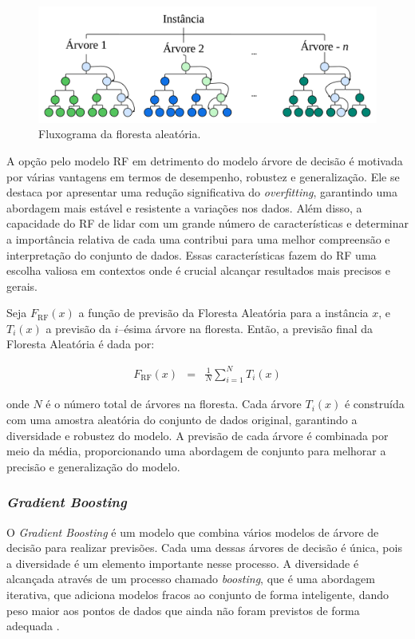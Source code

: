  \begin{figure}[!htb]
 	\centering
 	\caption{Fluxograma da floresta aleatória.}
 	\label{fig:rf}
 	\includegraphics[width=\linewidth]{Modelos/Figuras/RF.pdf}
 \end{figure}
 
A opção pelo modelo RF em detrimento do modelo árvore de decisão é motivada por várias vantagens em termos de desempenho, robustez e generalização. Ele se destaca por apresentar uma redução significativa do \textit{overfitting}, garantindo uma abordagem mais estável e resistente a variações nos dados. Além disso, a capacidade do RF de lidar com um grande número de características e determinar a importância relativa de cada uma contribui para uma melhor compreensão e interpretação do conjunto de dados. Essas características fazem do RF uma escolha valiosa em contextos onde é crucial alcançar resultados mais precisos e gerais.

Seja $ F_{\text{RF}}(x) $ a função de previsão da Floresta Aleatória para a instância $ x $, e $ T_i(x) $ a previsão da $ i $--ésima árvore na floresta. Então, a previsão final da Floresta Aleatória é dada por:

\begin{eqnarray}
	F_{\text{RF}}(x) &=& \frac{1}{N} \sum_{i=1}^{N} T_i(x) 
\end{eqnarray}

\noindent onde $ N $ é o número total de árvores na floresta. Cada árvore $ T_i(x) $ é construída com uma amostra aleatória do conjunto de dados original, garantindo a diversidade e robustez do modelo. A previsão de cada árvore é combinada por meio da média, proporcionando uma abordagem de conjunto para melhorar a precisão e generalização do modelo.
 
 \subsubsection{\textit{Gradient Boosting}}\label{subsubsec:lgbxgb}
 
 O \textit{Gradient Boosting} é um modelo que combina vários modelos de árvore de decisão para realizar previsões. Cada uma dessas árvores de decisão é única, pois a diversidade é um elemento importante nesse processo. A diversidade é alcançada através de um processo chamado \textit{boosting}, que é uma abordagem iterativa, que adiciona modelos fracos ao conjunto de forma inteligente, dando peso maior aos pontos de dados que ainda não foram previstos de forma adequada \cite{BUEECHI2023109596}. 
 
